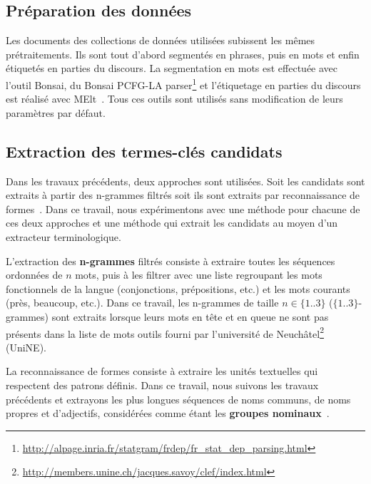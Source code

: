   \subsection{Préparation des données}
  \label{subsec:preparation_des_donnees}
    Les documents des collections de données utilisées subissent les mêmes
    prétraitements. Ils sont tout d'abord segmentés en phrases, puis en mots et
    enfin étiquetés en parties du discours. La segmentation en mots est
    effectuée avec l'outil Bonsai, du Bonsai PCFG-LA
    parser\footnote{\url{http://alpage.inria.fr/statgram/frdep/fr_stat_dep_parsing.html}}
    et l'étiquetage en parties du discours est réalisé avec
    MElt~\cite{denis2009melt}. Tous ces outils sont utilisés sans modification
    de leurs paramètres par défaut.

  \subsection{Extraction des termes-clés candidats}
  \label{subsec:extraction_de_termes_cles_candidats}
    Dans les travaux précédents, deux approches sont utilisées. Soit les
    candidats sont extraits à partir des n-grammes filtrés soit ils sont
    extraits par reconnaissance de formes~\cite{hulth2003keywordextraction}.
    Dans ce travail, nous expérimentons avec une méthode pour chacune de ces
    deux approches et une méthode qui extrait les candidats au moyen d'un
    extracteur terminologique.

    L'extraction des \textbf{n-grammes} filtrés consiste à extraire toutes les
    séquences ordonnées de $n$ mots, puis à les filtrer avec une liste
    regroupant les mots fonctionnels de la langue (conjonctions, prépositions,
    etc.) et les mots courants (\og{}près\fg{}, \og{}beaucoup\fg{}, etc.). Dans
    ce travail, les n-grammes de taille $n \in \{1..3\}$ ($\{1..3\}$-grammes)
    sont extraits lorsque leurs mots en tête et en queue ne sont pas présents
    dans la liste de mots outils fourni par l'université de
    Neuchâtel\footnote{\url{http://members.unine.ch/jacques.savoy/clef/index.html}}
    (UniNE).

    La reconnaissance de formes consiste à extraire les unités textuelles qui
    respectent des patrons définis. Dans ce travail, nous suivons les travaux
    précédents et extrayons les plus longues séquences de noms communs, de noms
    propres et d'adjectifs, considérées comme étant les \textbf{groupes
    nominaux}~\cite{hassan2010conundrums}.

